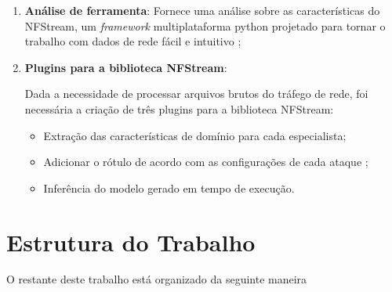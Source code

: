 \begin{enumerate}
    \item \textbf{Análise de ferramenta}: Fornece uma análise sobre as características do NFStream, um \emph{framework} multiplataforma python projetado para tornar o trabalho com dados de rede fácil e intuitivo \cite{AOUINI2022108719};
    \item \textbf{Plugins para a biblioteca NFStream}:
        \par{
            Dada a necessidade de processar arquivos brutos do tráfego de rede, foi necessária a criação de três plugins para a biblioteca NFStream:
            \begin{itemize}
                \item Extração das características de domínio para cada especialista;
                \item Adicionar o rótulo de acordo com as configurações de cada ataque \cite{Sharafaldin2018TowardGA};
                \item Inferência do modelo gerado em tempo de execução.
            \end{itemize}
        }
\end{enumerate}


\section{Estrutura do Trabalho}

O restante deste trabalho está organizado da seguinte maneira 


